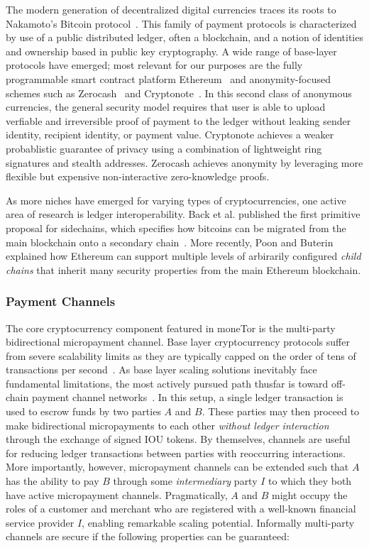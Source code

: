 The modern generation of decentralized digital currencies traces its roots to
Nakamoto's Bitcoin protocol~\cite{nakamoto2008bitcoin}. This family of payment
protocols is characterized by use of a public distributed ledger, often a
blockchain, and a notion of identities and ownership based in public key
cryptography. A wide range of base-layer protocols have emerged; most
relevant for our purposes are the fully programmable smart contract platform
Ethereum~\cite{wood2014ethereum} and anonymity-focused schemes such as
Zerocash~\cite{sasson2014zerocash} and Cryptonote~\cite{van2013cryptonote}. In
this second class of anonymous currencies, the general security model requires
that user is able to upload verfiable and irreversible proof of payment to the
ledger without leaking sender identity, recipient identity, or payment
value. Cryptonote achieves a weaker probablistic guarantee of privacy using
a combination of lightweight ring signatures and stealth addresses. Zerocash
achieves anonymity by leveraging more flexible but expensive non-interactive
zero-knowledge proofs.

As more niches have emerged for varying types of cryptocurrencies, one active
area of research is ledger interoperability. Back et al. published the first
primitive proposal for sidechains, which specifies how bitcoins can be migrated
from the main blockchain onto a secondary chain~\cite{back2014enabling}.  More
recently, Poon and Buterin explained how Ethereum can support multiple levels of
arbirarily configured \emph{child chains} that inherit many security properties
from the main Ethereum blockchain.

\subsubsection{Payment Channels}

The core cryptocurrency component featured in moneTor is the multi-party
bidirectional micropayment channel. Base layer cryptocurrency protocols suffer
from severe scalability limits as they are typically capped on the order of tens
of transactions per second~\cite{team2018blockchain}. As base layer scaling
solutions inevitably face fundamental limitations, the most actively pursued
path thusfar is toward off-chain payment channel
networks~\cite{poon2016bitcoin}. In this setup, a single ledger transaction is
used to escrow funds by two parties $A$ and $B$. These parties may then proceed
to make bidirectional micropayments to each other \emph{without ledger
  interaction} through the exchange of signed IOU tokens. By themselves,
channels are useful for reducing ledger transactions between parties with
reoccurring interactions. More importantly, however, micropayment channels can
be extended such that $A$ has the ability to pay $B$ through some
\emph{intermediary} party $I$ to which they both have active micropayment
channels. Pragmatically, $A$ and $B$ might occupy the roles of a customer and
merchant who are registered with a well-known financial service provider $I$,
enabling remarkable scaling potential. Informally multi-party channels are
secure if the following properties can be guaranteed:

